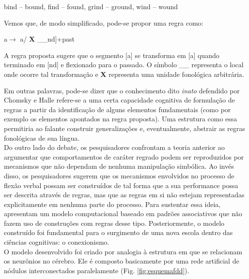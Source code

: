 \begin{center}
bind – bound, find – found, grind – ground, wind – wound
\end{center}

Vemos que, de modo simplificado, pode-se propor uma regra como:

\begin{center}
a\textsci $\rightarrow$ a\textupsilon / \textbf{X}  \_\_nd]+past
\end{center}

A regra proposta sugere que o segmento [a\textsci] se transforma em [a\textupsilon] quando terminado em [nd] e flexionado para o passado. O símbolo \_\_ representa o local onde ocorre tal transformação e \textbf{X} representa uma unidade fonológica arbitrária. 

Em outras palavras, pode-se dizer que o conhecimento dito \textit{inato} defendido por Chomsky e Halle refere-se a uma certa capacidade cognitiva de formulação de regras a partir da identificação de alguns elementos fundamentais (como por exemplo os elementos apontados na regra proposta). Uma estrutura como essa permitiria ao falante construir generalizações e, eventualmente, abstrair as regras fonológicas de sua língua. \\

Do outro lado do debate, os pesquisadores \cite{rumelhart:1986} confrontam a teoria anterior ao argumentar que comportamentos de caráter regrado podem ser reproduzidos por mecanismos que não dependam de nenhuma manipulação simbólica. Ao invés disso, os pesquisadores sugerem que os mecanismos envolvidos no processo de flexão verbal possam ser construídos de tal forma que a sua performance possa ser descrita através de regras, mas que as regras em si não estejam representadas explicitamente em nenhuma parte do processo. Para sustentar essa ideia, \cite{rumelhart:1986} apresentam um modelo computacional baseado em padrões associativos que não fazem uso de construções com regras desse tipo. Posteriormente, o modelo construído foi fundamental para o surgimento de uma nova escola dentro das ciências cognitivas: o conexionismo.\\




O modelo desenvolvido foi criado por analogia à estrutura em que se relacionam os neurônios no cérebro. Ele é composto basicamente por uma rede artificial de nódulos interconectados paralelamente (Fig. \ref{fig:esquemafdd}).

